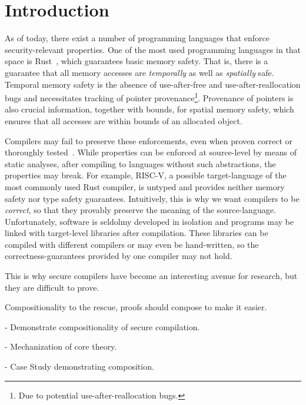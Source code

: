 

\section{Introduction}\label{sec:introduction}

As of today, there exist a number of programming languages that enforce security-relevant properties.
One of the most used programming languages in that space is Rust~\cite{}, which guarantees basic memory safety.
That is, there is a guarantee that all memory accesses are {\em temporally} as well as {\em spatially} safe. 
Temporal memory safety is the absence of use-after-free and use-after-reallocation bugs and necessitates tracking of pointer provenance\footnote{Due to potential use-after-reallocation bugs.}. %
Provenance of pointers is also crucial information, together with bounds, for spatial memory safety, which ensures that all accesses are within bounds of an allocated object.

Compilers may fail to preserve these enforcements, even when proven correct or thoroughly tested~\cite{}.
While properties can be enforced at source-level by means of static analyses, after compiling to languages without such abstractions, the properties may break.
For example, RISC-V, a possible target-language of the most commonly used Rust compiler, is untyped and provides neither memory safety nor type safety guarantees.
Intuitively, this is why we want compilers to be {\em correct}, so that they provably preserve the meaning of the source-language.
Unfortunately, software is seldolmy developed in isolation and programs may be linked with target-level libraries after compilation.
These libraries can be compiled with different compilers or may even be hand-written, so the correctness-guarantees provided by one compiler may not hold.

This is why secure compilers have become an interesting avenue for research, but they are difficult to prove.

Compositionality to the rescue, proofs should compose to make it easier.


- Demonstrate compositionality of secure compilation.

- Mechanization of core theory.

- Case Study demonstrating composition.

